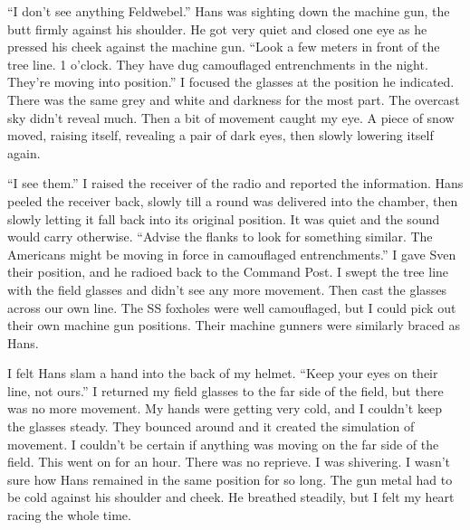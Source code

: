 \documentclass[14pt,a4paper]{memoir}
\begin{document}
“I don’t see anything Feldwebel.” Hans was sighting down the machine gun, the butt firmly against his shoulder.
He got very quiet and closed one eye as he pressed his cheek against the machine gun. “Look a few meters in front of the tree line. 1 o’clock. They have dug camouflaged entrenchments in the night. They’re moving into position.” I focused the glasses at the position he indicated. There was the same grey and white and darkness for the most part. The overcast sky didn’t reveal much. Then a bit of movement caught my eye. A piece of snow moved, raising itself, revealing a pair of dark eyes, then slowly lowering itself again.

“I see them.” I raised the receiver of the radio and reported the information. Hans peeled the receiver back, slowly till a round was delivered into the chamber, then slowly letting it fall back into its original position. It was quiet and the sound would carry otherwise.
“Advise the flanks to look for something similar. The Americans might be moving in force in camouflaged entrenchments.” I gave Sven their position, and he radioed back to the Command Post. I swept the tree line with the field glasses and didn’t see any more movement. Then cast the glasses across our own line. The SS foxholes were well camouflaged, but I could pick out their own machine gun positions. Their machine gunners were similarly braced as Hans.

I felt Hans slam a hand into the back of my helmet. “Keep your eyes on their line, not ours.” I returned my field glasses to the far side of the field, but there was no more movement. My hands were getting very cold, and I couldn’t keep the glasses steady. They bounced around and it created the simulation of movement. I couldn’t be certain if anything was moving on the far side of the field. This went on for an hour. There was no reprieve. I was shivering. I wasn’t sure how Hans remained in the same position for so long. The gun metal had to be cold against his shoulder and cheek. He breathed steadily, but I felt my heart racing the whole time.
\end{document}
